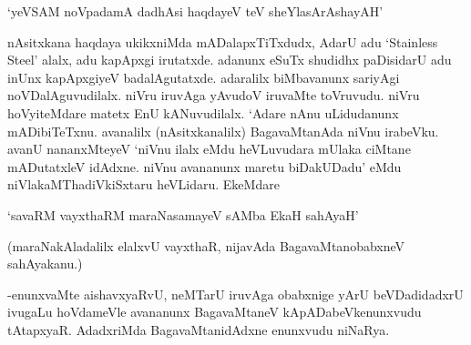 \begin{shloka}
`yeVSAM noVpadamA dadhAsi haqdayeV teV sheYlasArAshayAH'
\end{shloka}

nAsitxkana haqdaya ukikxniMda mADalapxTiTxdudx, AdarU adu `{\eng Stainless Steel}' alalx, adu kapApxgi irutatxde. adanunx eSuTx shudidhx paDisidarU adu inUnx kapApxgiyeV badalAgutatxde. adaralilx biMbavanunx sariyAgi noVDalAguvudilalx. niVru iruvAga yAvudoV iruvaMte toVruvudu. niVru hoVyiteMdare matetx EnU kANuvudilalx. `Adare nAnu uLidudanunx mADibiTeTxnu. avanalilx (nAsitxkanalilx) BagavaMtanAda niVnu irabeVku. avanU nananxMteyeV `niVnu ilalx eMdu heVLuvudara mUlaka ciMtane mADutatxleV idAdxne. niVnu avananunx maretu biDakUDadu' eMdu niVlakaMThadiVkiSxtaru heVLidaru. EkeMdare

\begin{shloka}
`savaRM vayxthaRM maraNasamayeV sAMba EkaH sahAyaH'
\end{shloka}

(maraNakAladalilx elalxvU vayxthaR, nijavAda BagavaMtanobabxneV sahAyakanu.)

-enunxvaMte aishavxyaRvU, neMTarU iruvAga obabxnige yArU beVDadidadxrU ivugaLu hoVdameVle avananunx BagavaMtaneV kApADabeVkenunxvudu tAtapxyaR. AdadxriMda BagavaMtanidAdxne enunxvudu niNaRya.



\endchapter
